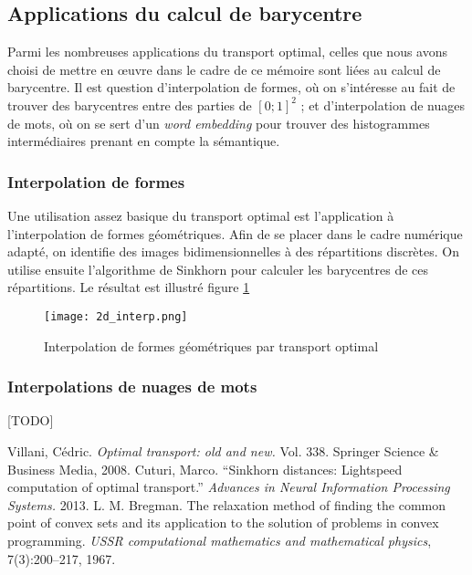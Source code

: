 \subsection{Applications du calcul de barycentre}

Parmi les nombreuses applications du transport optimal, celles que nous avons choisi de mettre en \oe uvre dans le cadre de ce mémoire sont liées au calcul de barycentre. Il est question d'interpolation de formes, où on s'intéresse au fait de trouver des barycentres entre des parties de $[0;1]^2$ ; et d'interpolation de nuages de mots, où on se sert d'un \emph{word embedding} pour trouver des histogrammes intermédiaires prenant en compte la sémantique.

\subsubsection{Interpolation de formes}
Une utilisation assez basique du transport optimal est l'application à l'interpolation de formes géométriques. Afin de se placer dans le cadre numérique adapté, on identifie des images bidimensionnelles à des répartitions discrètes. On utilise ensuite l'algorithme de Sinkhorn pour calculer les barycentres de ces répartitions. Le résultat est illustré figure \ref{fig:2d_interp}

\begin{figure}
\centering
\texttt{[image: 2d\_interp.png]}
\caption{Interpolation de formes géométriques par transport optimal}
\label{fig:2d_interp}
\end{figure}

\subsubsection{Interpolations de nuages de mots}
[TODO]


\medskip
\begin{thebibliography}{99}
Villani, Cédric. \textit{Optimal transport: old and new.} Vol. 338. Springer Science \& Business Media, 2008.
Cuturi, Marco. ``Sinkhorn distances: Lightspeed computation of optimal transport.'' \textit{Advances in Neural Information Processing Systems.} 2013.
L. M. Bregman. The relaxation method of finding the common point of
convex sets and its application to the solution of problems in convex programming.
\textit{USSR computational mathematics and mathematical physics},
7(3):200–217, 1967.
\end{thebibliography}

